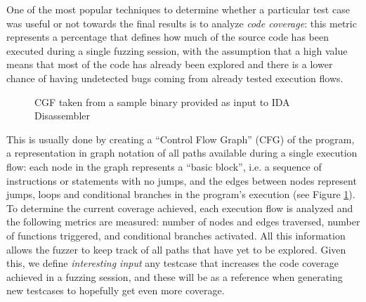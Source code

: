 One of the most popular techniques to determine whether a particular test case was useful or not towards the final results is to analyze \textit{code coverage}: this metric represents a percentage that defines how much of the source code has been executed during a single fuzzing session, with the assumption that a high value means that most of the code has already been explored and there is a lower chance of having undetected bugs coming from already tested execution flows.
\begin{figure}[h]
\caption{CGF taken from a sample binary provided as input to IDA Disassembler \cite{ida}}
\label{fig:cfg}
\end{figure}


\newpage
This is usually done by creating a ``Control Flow Graph'' (CFG) of the program, a representation in graph notation of all paths available during a single execution flow: each node in the graph represents a ``basic block'', i.e. a sequence of instructions or statements with no jumps, and the edges between nodes represent jumps, loops and conditional branches in the program's execution (see Figure \ref{fig:cfg}). To determine the current coverage achieved, each execution flow is analyzed and the following metrics are measured: number of nodes and edges traversed, number of functions triggered, and conditional branches activated. All this information allows the fuzzer to keep track of all paths that have yet to be explored. Given this, we define \textit{interesting input} any testcase that increases the code coverage achieved in a fuzzing session, and these will be as a reference when generating new testcases to hopefully get even more coverage.


